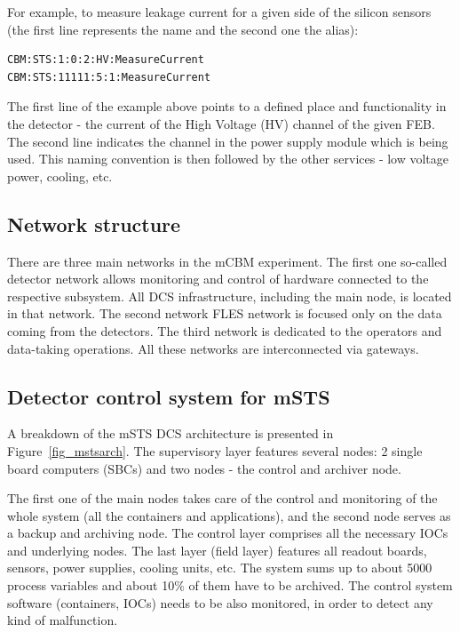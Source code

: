 For example, to measure leakage current for a given side of the silicon sensors  (the first line represents the name and the second one the alias):
\begin{verbatim}
CBM:STS:1:0:2:HV:MeasureCurrent
CBM:STS:11111:5:1:MeasureCurrent
\end{verbatim}
The first line of the example above points to a defined place and functionality in the detector - the current of the High Voltage (\gls{HV}) channel of the given \gls{FEB}. The second line indicates the channel in the power supply module which is being used. This naming convention is then followed by the other services - low voltage power, cooling, etc.  
\subsection{Network structure}
There are three main networks in the mCBM experiment. The first one so-called detector network allows monitoring and control of hardware connected to the respective subsystem. All \gls{DCS} infrastructure, including the main node, is located in that network. The second network FLES network is focused only on the data coming from the detectors. The third network is dedicated to the operators and data-taking operations. All these networks are interconnected via gateways.  

\subsection{Detector control system for mSTS}
A breakdown of the \gls{mSTS} \gls{DCS} architecture is presented in Figure~\ref{fig_mstsarch}. The supervisory layer features several nodes: 2 single board computers (\glspl{SBC}) and two nodes - the control and archiver node. 

The first one of the main nodes takes care of the control and monitoring of the whole system (all the containers and applications), and the second node serves as a backup and archiving node. The control layer comprises all the necessary \glspl{IOC} and underlying nodes. The last layer (field layer) features all readout boards, sensors, power supplies, cooling units, etc. The system sums up to about 5000 process variables and about 10\% of them have to be archived. The control system software (containers, \glspl{IOC}) needs to be also monitored, in order to detect any kind of malfunction. 


